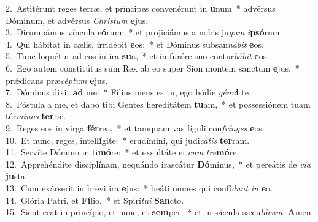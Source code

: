 {2.~}Astitérunt reges terræ, et príncipes convenérunt in \textbf{u}num~* advérsus Dóminum, et advérsus \textit{Chri}\textit{stum} \textbf{e}jus.\\
{3.~}Dirumpámus víncula e\textbf{ó}rum:~* et projiciámus a nobis ju\textit{gum} \textit{i}\textbf{psó}rum.\\
{4.~}Qui hábitat in cælis, irridébit \textbf{e}os:~* et Dóminus subsan\textit{ná}\textit{bit} \textbf{e}os.\\
{5.~}Tunc loquétur ad eos in ira \textbf{su}a,~* et in furóre suo contur\textit{bá}\textit{bit} \textbf{e}os.\\
{6.~}Ego autem constitútus sum Rex ab eo super Sion montem sanctum \textbf{e}jus,~* prǽdicans præ\textit{cép}\textit{tum} \textbf{e}jus.\\
{7.~}Dóminus dixit \textbf{ad} me:~* Fílius meus es tu, ego hódie \textit{gé}\textit{nu}\textbf{i} te.\\
{8.~}Póstula a me, et dabo tibi Gentes hereditátem \textbf{tu}am,~* et possessiónem tuam tér\textit{mi}\textit{nos} \textbf{ter}ræ.\\
{9.~}Reges eos in virga \textbf{fér}rea,~* et tamquam vas fíguli con\textit{frín}\textit{ges} \textbf{e}os.\\
{10.~}Et nunc, reges, intel\textbf{lí}gite:~* erudímini, qui judi\textit{cá}\textit{tis} \textbf{ter}ram.\\
{11.~}Servíte Dómino in ti\textbf{mó}re:~* et exsultáte ei \textit{cum} \textit{tre}\textbf{mó}re.\\
{12.~}Apprehéndite disciplínam, nequándo irascátur \textbf{Dó}minus,~* et pereátis de \textit{vi}\textit{a} \textbf{ju}sta.\\
{13.~}Cum exárserit in brevi ira \textbf{e}jus:~* beáti omnes qui confí\textit{dunt} \textit{in} \textbf{e}o.\\
{14.~}Glória Patri, et \textbf{Fí}lio,~* et Spirí\textit{tu}\textit{i} \textbf{San}cto.\\
{15.~}Sicut erat in princípio, et nunc, et \textbf{sem}per,~* et in sǽcula sæcu\textit{ló}\textit{rum}. \textbf{A}men.\\
